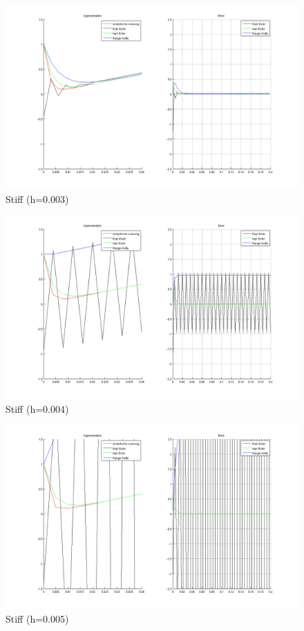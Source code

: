 \documentclass[10pt]{scrartcl}
\begin{document}
	
	\begin{figure}[H]
			\centering	
			\includegraphics[width=\textwidth]{stiff0003.png}
            \caption{Stiff (h=0.003)}
            \label{pic:stuff003}
		\end{figure} 
	
	
	\begin{figure}[H]
			\centering	
			\includegraphics[width=\textwidth]{stiff0004.png}
            \caption{Stiff (h=0.004)}
            \label{pic:stuff004}
		\end{figure} 
	
	\begin{figure}[H]
			\centering	
			\includegraphics[width=\textwidth]{stiff0005.png}
            \caption{Stiff (h=0.005)}
            \label{pic:stuff005}
		\end{figure} 
	
\end{document}
